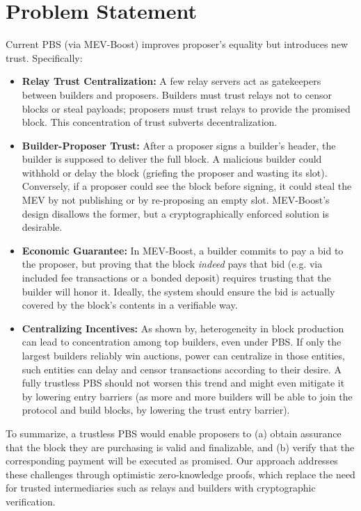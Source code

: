 \documentclass[11pt]{article}
\begin{document}
\section{Problem Statement}
\label{sec:problem}
Current PBS (via MEV-Boost) improves proposer's equality but introduces new trust. Specifically:
\begin{itemize}
    \item \textbf{Relay Trust Centralization:} A few relay servers act as gatekeepers between builders and proposers. Builders must trust relays not to censor blocks or steal payloads; proposers must trust relays to provide the promised block. This concentration of trust subverts decentralization.
    \item \textbf{Builder-Proposer Trust:} After a proposer signs a builder’s header, the builder is supposed to deliver the full block. A malicious builder could withhold or delay the block (griefing the proposer and wasting its slot). Conversely, if a proposer could see the block before signing, it could steal the MEV by not publishing or by re-proposing an empty slot. MEV-Boost’s design disallows the former, but a cryptographically enforced solution is desirable.
    \item \textbf{Economic Guarantee:} In MEV-Boost, a builder commits to pay a bid to the proposer, but proving that the block \emph{indeed} pays that bid (e.g. via included fee transactions or a bonded deposit) requires trusting that the builder will honor it. Ideally, the system should ensure the bid is actually covered by the block’s contents in a verifiable way.
    \item \textbf{Centralizing Incentives:} As shown by, heterogeneity in block production can lead to concentration among top builders, even under PBS. If only the largest builders reliably win auctions, power can centralize in those entities, such entities can delay and censor transactions according to their desire. A fully trustless PBS should not worsen this trend and might even mitigate it by lowering entry barriers (as more and more builders will be able to join the protocol and build blocks, by lowering the trust entry barrier).
\end{itemize}
To summarize, a trustless PBS would enable proposers to (a) obtain assurance that the block they are purchasing is valid and finalizable, and (b) verify that the corresponding payment will be executed as promised. Our approach addresses these challenges through optimistic zero-knowledge proofs, which replace the need for trusted intermediaries such as relays and builders with cryptographic verification.
\end{document}
